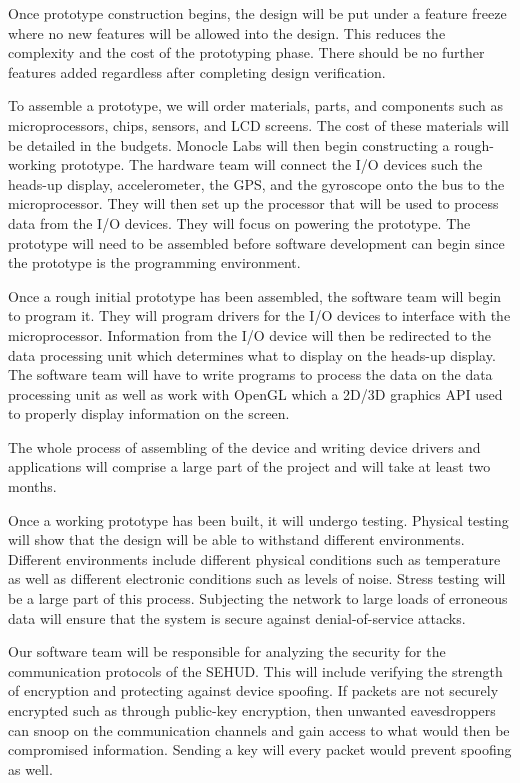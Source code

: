 Once prototype construction begins, the design will be put under a feature
freeze where no new features will be allowed into the design. This reduces
the complexity and the cost of the prototyping phase. There should be no
further features added regardless after completing design verification.

To assemble a prototype, we will order materials, parts, and components such
as microprocessors, chips, sensors, and LCD screens. The cost of these
materials will be detailed in the budgets. Monocle Labs will then begin
constructing a rough-working prototype. The hardware team will connect the
I/O devices such the heads-up display, accelerometer, the GPS, and the
gyroscope onto the bus to the microprocessor. They will then set up the
processor that will be used to process data from the I/O devices. They will
focus on powering the prototype. The prototype will need to be assembled
before software development can begin since the prototype is the programming
environment.

Once a rough initial prototype has been assembled, the software team will
begin to program it. They will program drivers for the I/O devices to
interface with the microprocessor. Information from the I/O device will then
be redirected to the data processing unit which determines what to display on
the heads-up display. The software team will have to write programs to
process the data on the data processing unit as well as work with OpenGL
which a 2D/3D graphics API used to properly display information on the
screen.

The whole process of assembling of the device and writing device drivers and
applications will comprise a large part of the project and will take at least
two months.

Once a working prototype has been built, it will undergo testing. Physical
testing will show that the design will be able to withstand different
environments. Different environments include different physical conditions
such as temperature as well as different electronic conditions such as levels
of noise. Stress testing will be a large part of this process. Subjecting the
network to large loads of erroneous data will ensure that the system is
secure against denial-of-service attacks.

Our software team will be responsible for analyzing the security for the
communication protocols of the SEHUD. This will include verifying the
strength of encryption and protecting against device spoofing. If packets are
not securely encrypted such as through public-key encryption, then unwanted
eavesdroppers can snoop on the communication channels and gain access to what
would then be compromised information. Sending a key will every packet would
prevent spoofing as well.

